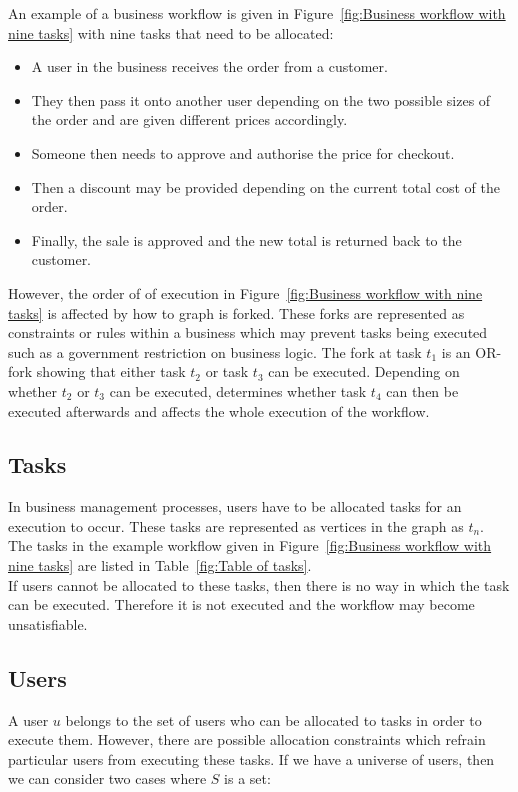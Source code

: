 \documentclass[a4paper]{report}
\begin{document}
An example of a business workflow is given in Figure~\ref{fig:Business workflow with nine tasks} with nine tasks that need to be allocated:
\begin{itemize}
\item A user in the business receives the order from a customer.
\item They then pass it onto another user depending on the two possible sizes of the order and are given different prices accordingly. 
\item Someone then needs to approve and authorise the price for checkout.
\item Then a discount may be provided depending on the current total cost of the order.
\item Finally, the sale is approved and the new total is returned back to the customer.
\end{itemize}

However, the order of of execution in Figure~\ref{fig:Business workflow with nine tasks} is affected by how to graph is forked. These forks are represented as constraints or rules within a business which may prevent tasks being executed such as a government restriction on business logic. The fork at task $t_{1}$ is an OR-fork showing that either task $t_{2}$ or task $t_{3}$ can be executed. Depending on whether $t_{2}$ or $t_{3}$ can be executed, determines whether task $t_{4}$ can then be executed afterwards and affects the whole execution of the workflow.  \\

\subsection{Tasks}
In business management processes, users have to be allocated tasks for an execution to occur. These tasks are represented as vertices in the graph as $t_{n}$. The tasks in the example workflow given in Figure~\ref{fig:Business workflow with nine tasks} are listed in Table~\ref{fig:Table of tasks}.\\

If users cannot be allocated to these tasks, then there is no way in which the task can be executed. Therefore it is not executed and the workflow may become unsatisfiable.\\

\subsection{Users}
A user $u$ belongs to the set of users who can be allocated to tasks in order to execute them. However, there are possible allocation constraints which refrain particular users from executing these tasks. If we have a universe of users, then we can consider two cases where $S$ is a set:
\end{document}
